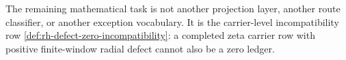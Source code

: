 \begin{principle}
\label{prin:rh-no-further-route-layer}
The remaining mathematical task is not another projection layer, another
route classifier, or another exception vocabulary. It is the carrier-level
incompatibility row
\autoref{def:rh-defect-zero-incompatibility}: a completed zeta carrier row
with positive finite-window radial defect cannot also be a zero ledger.
\end{principle}

